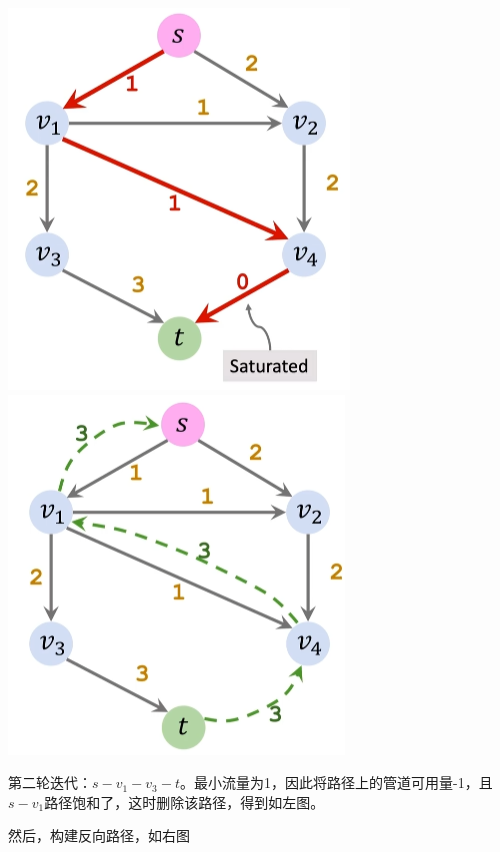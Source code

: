 \documentclass[a4paper]{article}    %
\begin{document}
\begin{center}
    \includegraphics[scale=0.5]{28.png}
    \includegraphics[scale=0.5]{29.png}
\end{center}

第二轮迭代：$s-v_1-v_3-t$。最小流量为1，因此将路径上的管道可用量-1，且$s-v_1$路径饱和了，这时删除该路径，得到如左图。

然后，构建反向路径，如右图
\end{document}
